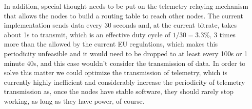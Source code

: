 In addition, special thought needs to be put on the telemetry relaying mechanism that allows the nodes to build a routing table to reach other nodes. The current implementation sends data every 30 seconds and, at the current bitrate, takes about 1s to transmit, which is an effective duty cycle of $ 1/30 = 3.3\% $, 3 times more than the allowed by the current EU regulations, which makes this periodicity unfeasible and it would need to be dropped to at least every 100s or 1 minute 40s, and this case wouldn't consider the transmission of data. In order to solve this matter we could optimize the transmission of telemetry, which is currently highly inefficient and considerably increase the periodicity of telemetry transmission as, once the nodes have stable software, they should rarely stop working, as long as they have power, of course.
